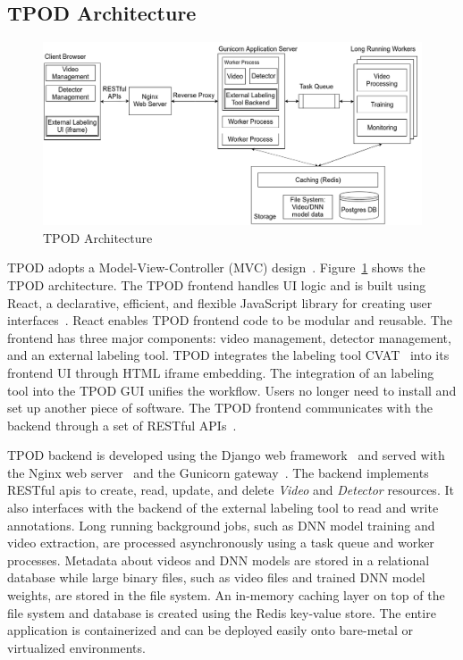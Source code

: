 \subsection{TPOD Architecture}

\begin{figure}[]
  \hspace{-.1in}
    \includegraphics[width=1.1\textwidth]{FIGS/tpod-arch}
    \caption{TPOD Architecture}
  \label{figs:tpod-arch}
\end{figure}

TPOD adopts a Model-View-Controller (MVC) design~\cite{krasner1988description}.
Figure~\ref{figs:tpod-arch} shows the TPOD architecture. The TPOD frontend
handles UI logic and is built using React, a declarative, efficient, and
flexible JavaScript library for creating user interfaces~\cite{staff2016react}.
React enables TPOD frontend code to be modular and reusable. The frontend has
three major components: video management, detector management, and an external
labeling tool. TPOD integrates the labeling tool CVAT~\cite{cvat2019} into its
frontend UI through HTML iframe embedding. The integration of an labeling tool
into the TPOD GUI unifies the workflow. Users no longer need to install and set
up another piece of software. The TPOD frontend communicates with the backend
through a set of RESTful APIs~\cite{richardson2008restful}. 

TPOD backend is developed using the Django web
framework~\cite{holovaty2009definitive} and served with the Nginx web
server~\cite{nedelcu2010nginx} and the Gunicorn gateway~\cite{gunicorn2017http}.
The backend implements RESTful apis to create, read, update, and delete
\textit{Video} and \textit{Detector} resources. It also interfaces with the
backend of the external labeling tool to read and write annotations. Long
running background jobs, such as DNN model training and video extraction, are
processed asynchronously using a task queue and worker processes. Metadata about
videos and DNN models are stored in a relational database while large binary
files, such as video files and trained DNN model weights, are stored in the file
system. An in-memory caching layer on top of the file system and database is
created using the Redis key-value store. The entire application is containerized and
can be deployed easily onto bare-metal or virtualized environments.

